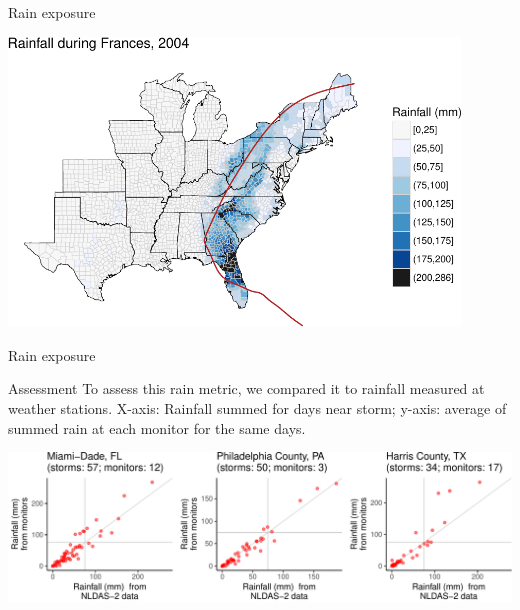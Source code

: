 \documentclass[ignorenonframetext,]{beamer}
\begin{document}
\begin{frame}{Rain exposure}

\begin{center}\includegraphics[width=0.9\textwidth]{anderson_jan11_files/figure-beamer/frances_rain_example-1} \end{center}

\end{frame}

\begin{frame}{Rain exposure}

\small

\begin{block}{Assessment}
To assess this rain metric, we compared it to rainfall measured at weather stations. X-axis: Rainfall summed for days near storm; y-axis: average of summed rain at each monitor for the same days.
\end{block}

\begin{flushleft}\includegraphics[width=1.05\textwidth]{anderson_jan11_files/figure-beamer/compare_rain_ex_counties-1} \end{flushleft}

\end{frame}
\end{document}
